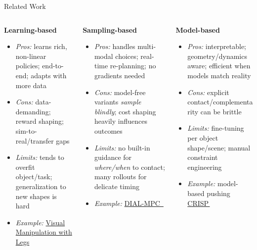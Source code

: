 \documentclass[10pt, aspectratio=169]{beamer}
\begin{document}
\begin{frame}{Related Work}
    \small
    \begin{columns}[T,onlytextwidth]
    \begin{column}{0.33\textwidth}
      \textbf{Learning-based}
          \begin{itemize}
            \item \emph{Pros:} learns rich, non-linear policies; end-to-end; adapts with more data
            \item \emph{Cons:} data-demanding; reward shaping; sim-to-real/transfer gaps
            \item \emph{Limits:} tends to overfit object/task; generalization to new shapes is hard
            \item \emph{Example:} \href{https://proceedings.mlr.press/v270/he25c.html}{\footnotesize Visual Manipulation with Legs}\,\footnotemark[1]
          \end{itemize}
        \end{column}
        
        \begin{column}{0.33\textwidth}
          \textbf{Sampling-based}
          \begin{itemize}
            \item \emph{Pros:} handles multi-modal choices; real-time re-planning; no gradients needed
            \item \emph{Cons:} model-free variants \emph{sample blindly}; cost shaping heavily influences outcomes
            \item \emph{Limits:} no built-in guidance for \emph{where/when} to contact; many rollouts for delicate timing
            \item \emph{Example:} \href{https://arxiv.org/abs/2409.15610}{\footnotesize DIAL-MPC \,\footnotemark[2]}
          \end{itemize}
        \end{column}
        
        \begin{column}{0.33\textwidth}
          \textbf{Model-based}
          \begin{itemize}
            \item \emph{Pros:} interpretable; geometry/dynamics aware; efficient when models match reality
            \item \emph{Cons:} explicit contact/complementarity can be brittle
            \item \emph{Limits:} fine-tuning per object shape/scene; manual constraint engineering
            \item \emph{Example:} model-based pushing \href{https://arxiv.org/abs/2502.01055}{\footnotesize CRISP\,\footnotemark[3]}
          \end{itemize}
    \end{column}
    \end{columns}
    

\end{frame}
\end{document}
